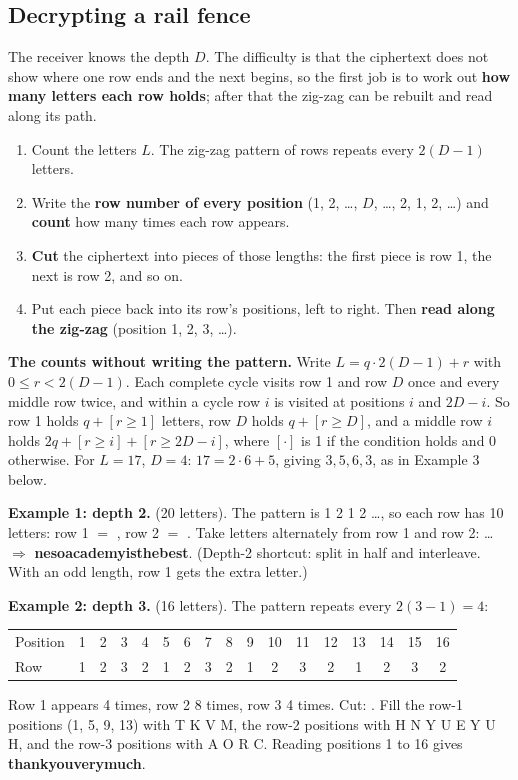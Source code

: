 \subsection{Decrypting a rail fence}
The receiver knows the depth $D$. The difficulty is that the ciphertext does not show where one row ends and the next begins, so the first job is to work out \textbf{how many letters each row holds}; after that the zig-zag can be rebuilt and read along its path.
\begin{enumerate}[leftmargin=1.5em]
  \item Count the letters $L$. The zig-zag pattern of rows repeats every $2(D-1)$ letters.
  \item Write the \textbf{row number of every position} (1, 2, \dots, $D$, \dots, 2, 1, 2, \dots) and \textbf{count} how many times each row appears.
  \item \textbf{Cut} the ciphertext into pieces of those lengths: the first piece is row 1, the next is row 2, and so on.
  \item Put each piece back into its row's positions, left to right. Then \textbf{read along the zig-zag} (position 1, 2, 3, \dots).
\end{enumerate}
\textbf{The counts without writing the pattern.} Write $L = q \cdot 2(D-1) + r$ with $0 \le r < 2(D-1)$. Each complete cycle visits row 1 and row $D$ once and every middle row twice, and within a cycle row $i$ is visited at positions $i$ and $2D - i$. So row 1 holds $q + [r \ge 1]$ letters, row $D$ holds $q + [r \ge D]$, and a middle row $i$ holds $2q + [r \ge i] + [r \ge 2D - i]$, where $[\cdot]$ is 1 if the condition holds and 0 otherwise. For $L = 17$, $D = 4$: $17 = 2 \cdot 6 + 5$, giving $3, 5, 6, 3$, as in Example 3 below.

\textbf{Example 1: depth 2.}  (20 letters). The pattern is 1 2 1 2 \dots, so each row has 10 letters:
row 1 $=$ , row 2 $=$ . Take letters alternately from row 1 and row 2:
\textbf{}\textbf{}\textbf{}\dots\ $\Rightarrow$ \textbf{nesoacademyisthebest}.
(Depth-2 shortcut: split in half and interleave. With an odd length, row 1 gets the extra letter.)

\textbf{Example 2: depth 3.}  (16 letters). The pattern repeats every $2(3-1) = 4$:
\begin{center}\small\setlength{\tabcolsep}{4pt}
\begin{tabular}{@{}l*{16}{c}@{}}
\toprule
Position & 1&2&3&4&5&6&7&8&9&10&11&12&13&14&15&16\\
Row & 1&2&3&2&1&2&3&2&1&2&3&2&1&2&3&2\\
\bottomrule
\end{tabular}
\end{center}
Row 1 appears 4 times, row 2 8 times, row 3 4 times. Cut: .
Fill the row-1 positions (1, 5, 9, 13) with T K V M, the row-2 positions with H N Y U E Y U H, and the row-3 positions with A O R C. Reading positions 1 to 16 gives \textbf{thankyouverymuch}.

